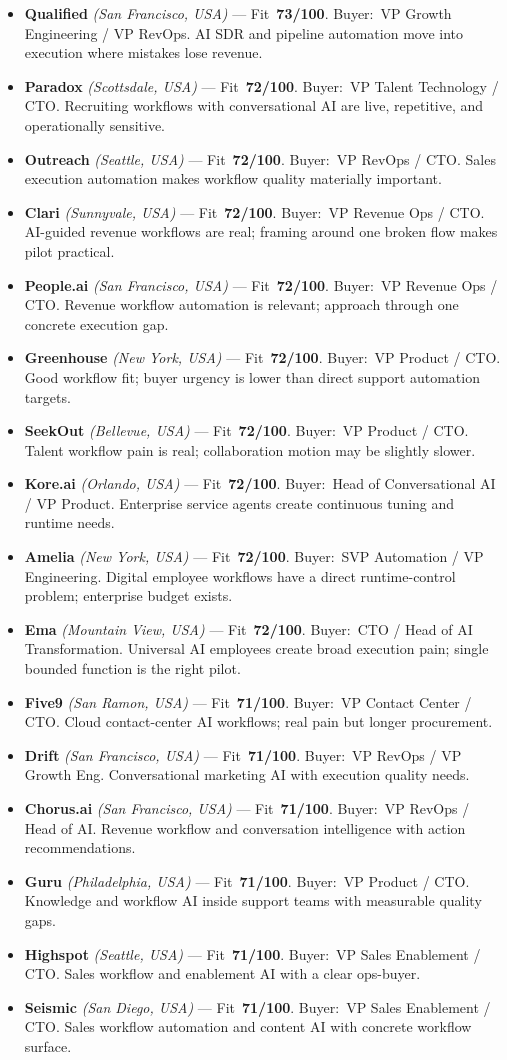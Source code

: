 \documentclass[10pt]{article}
\newcommand{\cand}[5]{\item \textbf{#1} \textit{(#2)} --- Fit~\textbf{#3/100}. Buyer:~#4. #5}
\begin{document}
\begin{itemize}
\cand{Qualified}{San Francisco, USA}{73}{VP Growth Engineering / VP RevOps}{AI SDR and pipeline automation move into execution where mistakes lose revenue.}
\cand{Paradox}{Scottsdale, USA}{72}{VP Talent Technology / CTO}{Recruiting workflows with conversational AI are live, repetitive, and operationally sensitive.}
\cand{Outreach}{Seattle, USA}{72}{VP RevOps / CTO}{Sales execution automation makes workflow quality materially important.}
\cand{Clari}{Sunnyvale, USA}{72}{VP Revenue Ops / CTO}{AI-guided revenue workflows are real; framing around one broken flow makes pilot practical.}
\cand{People.ai}{San Francisco, USA}{72}{VP Revenue Ops / CTO}{Revenue workflow automation is relevant; approach through one concrete execution gap.}
\cand{Greenhouse}{New York, USA}{72}{VP Product / CTO}{Good workflow fit; buyer urgency is lower than direct support automation targets.}
\cand{SeekOut}{Bellevue, USA}{72}{VP Product / CTO}{Talent workflow pain is real; collaboration motion may be slightly slower.}
\cand{Kore.ai}{Orlando, USA}{72}{Head of Conversational AI / VP Product}{Enterprise service agents create continuous tuning and runtime needs.}
\cand{Amelia}{New York, USA}{72}{SVP Automation / VP Engineering}{Digital employee workflows have a direct runtime-control problem; enterprise budget exists.}
\cand{Ema}{Mountain View, USA}{72}{CTO / Head of AI Transformation}{Universal AI employees create broad execution pain; single bounded function is the right pilot.}
\cand{Five9}{San Ramon, USA}{71}{VP Contact Center / CTO}{Cloud contact-center AI workflows; real pain but longer procurement.}
\cand{Drift}{San Francisco, USA}{71}{VP RevOps / VP Growth Eng}{Conversational marketing AI with execution quality needs.}
\cand{Chorus.ai}{San Francisco, USA}{71}{VP RevOps / Head of AI}{Revenue workflow and conversation intelligence with action recommendations.}
\cand{Guru}{Philadelphia, USA}{71}{VP Product / CTO}{Knowledge and workflow AI inside support teams with measurable quality gaps.}
\cand{Highspot}{Seattle, USA}{71}{VP Sales Enablement / CTO}{Sales workflow and enablement AI with a clear ops-buyer.}
\cand{Seismic}{San Diego, USA}{71}{VP Sales Enablement / CTO}{Sales workflow automation and content AI with concrete workflow surface.}
\end{itemize}
\end{document}
